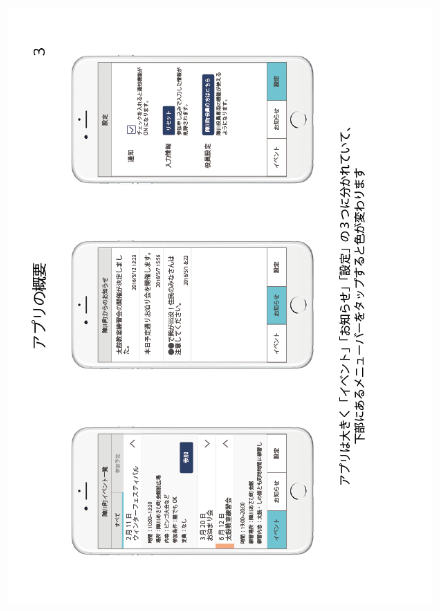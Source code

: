 \begin{figure}[ht]
    \begin{center}
      \includegraphics[keepaspectratio, scale=0.7]{appendixs/appendixB_figres/fig3.png}
    \end{center}
\end{figure}

